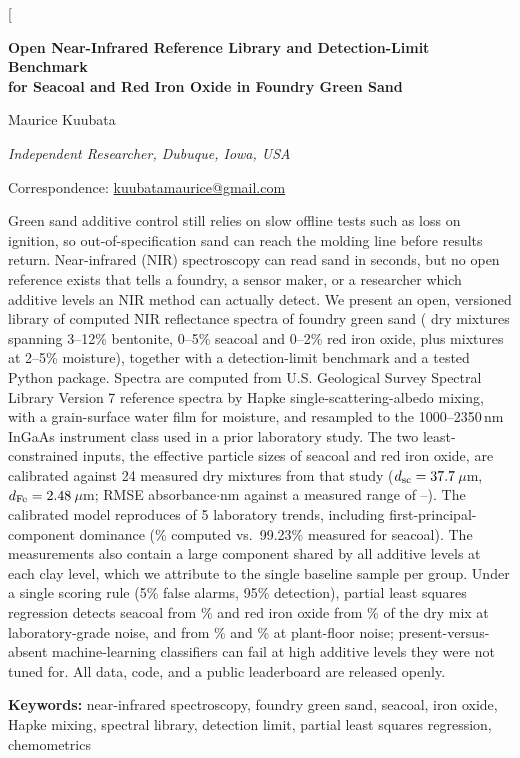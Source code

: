 \documentclass[10pt,twocolumn,letterpaper]{article}
\newcommand{\um}{\,$\mu$m}
\begin{document}
\twocolumn[
\begin{center}
{\large\bfseries Open Near-Infrared Reference Library and Detection-Limit Benchmark\\[2pt] for Seacoal and Red Iron Oxide in Foundry Green Sand\par}
\vspace{10pt}
{\normalsize Maurice Kuubata\,\par}
\vspace{3pt}
{\small\itshape Independent Researcher, Dubuque, Iowa, USA\par}
\vspace{2pt}
{\small Correspondence: \href{mailto:kuubatamaurice@gmail.com}{kuubatamaurice@gmail.com}\par}
\vspace{10pt}
\begin{minipage}{0.80\textwidth}
\small
Green sand additive control still relies on slow offline tests such as loss on ignition, so out-of-specification sand can reach the molding line before results return. Near-infrared (NIR) spectroscopy can read sand in seconds, but no open reference exists that tells a foundry, a sensor maker, or a researcher which additive levels an NIR method can actually detect. We present an open, versioned library of \nTotal{} computed NIR reflectance spectra of foundry green sand (\nDry{} dry mixtures spanning 3--12\% bentonite, 0--5\% seacoal and 0--2\% red iron oxide, plus \nMoist{} mixtures at 2--5\% moisture), together with a detection-limit benchmark and a tested Python package. Spectra are computed from U.S. Geological Survey Spectral Library Version 7 reference spectra by Hapke single-scattering-albedo mixing, with a grain-surface water film for moisture, and resampled to the 1000--2350\,nm InGaAs instrument class used in a prior laboratory study. The two least-constrained inputs, the effective particle sizes of seacoal and red iron oxide, are calibrated against 24 measured dry mixtures from that study ($d_{\rm sc}=37.7$\um, $d_{\rm Fe}=2.48$\um; RMSE \rmseOff{} absorbance$\cdot$nm against a measured range of \labAucMin--\labAucMax). The calibrated model reproduces \trendsCal{} of 5 laboratory trends, including first-principal-component dominance (\pcScCal\% computed vs.\ 99.23\% measured for seacoal). The measurements also contain a large component shared by all additive levels at each clay level, which we attribute to the single baseline sample per group. Under a single scoring rule (5\% false alarms, 95\% detection), partial least squares regression detects seacoal from \lodScDryLab\% and red iron oxide from \lodFeDryLab\% of the dry mix at laboratory-grade noise, and from \lodScDryPlant\% and \lodFeDryPlant\% at plant-floor noise; present-versus-absent machine-learning classifiers can fail at high additive levels they were not tuned for. All data, code, and a public leaderboard are released openly.

\vspace{4pt}
\textbf{Keywords:} near-infrared spectroscopy, foundry green sand, seacoal, iron oxide, Hapke mixing, spectral library, detection limit, partial least squares regression, chemometrics
\end{minipage}
\end{center}
\end{document}
